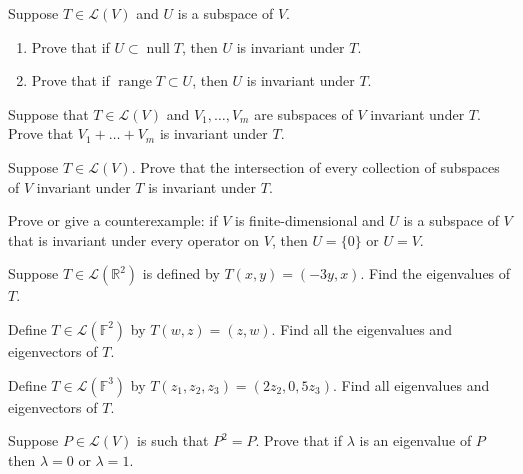 \documentclass[12 pt, letterpaper]{hmcpset}
\begin{document}
\begin{problem}[1]
	Suppose $T \in \mathcal{L}(V)$ and $U$ is a subspace of $V$.
	\begin{enumerate}
		\item Prove that if $U \subset \operatorname{null} T$, then $U$ is invariant under $T$.
		\item Prove that if $\operatorname{range} T \subset U$, then $U$ is invariant under $T$.
	\end{enumerate}
\end{problem}

\pagebreak

\begin{problem}[2]
	Suppose that $T \in \mathcal{L}(V)$ and $V_{1}, \dots, V_{m}$ are subspaces of $V$ invariant under $T$. Prove that $V_{1} + \dots + V_{m}$ is invariant under $T$.
\end{problem}

\pagebreak

\begin{problem}[3]
	Suppose $T \in \mathcal{L}(V)$. Prove that the intersection of every collection of subspaces of $V$ invariant under $T$ is invariant under $T$.
\end{problem}

\pagebreak

\begin{problem}[4]
	Prove or give a counterexample: if $V$ is finite-dimensional and $U$ is a subspace of $V$ that is invariant under every operator on $V$, then $U = \{ 0 \}$ or $U = V$.
\end{problem}

\pagebreak

\begin{problem}[5]
	Suppose $T \in \mathcal{L}(\mathbb{R}^{2})$ is defined by $T(x, y) = (-3y, x)$. Find the eigenvalues of $T$.
\end{problem}

\pagebreak

\begin{problem}[6]
	Define $T \in \mathcal{L}(\mathbb{F}^{2})$ by $T(w, z) = (z, w)$. Find all the eigenvalues and eigenvectors of $T$.
\end{problem}

\pagebreak

\begin{problem}[7]
	Define $T \in \mathcal{L}(\mathbb{F}^{3})$ by $T(z_{1}, z_{2}, z_{3}) = (2z_{2}, 0, 5z_{3})$. Find all eigenvalues and eigenvectors of $T$.
\end{problem}

\pagebreak

\begin{problem}[8]
	Suppose $P \in \mathcal{L}(V)$ is such that $P^{2} = P$. Prove that if $\lambda$ is an eigenvalue of $P$ then $\lambda = 0$ or $\lambda = 1$.
\end{problem}
\end{document}
